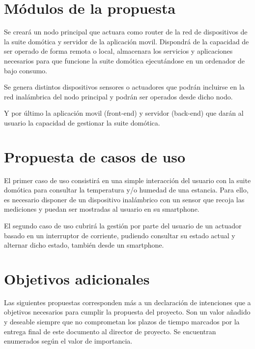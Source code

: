 \section{Módulos de la propuesta}
\label{ch:Capitulo3.2}

Se creará un nodo principal que actuara como router de la red de dispositivos de la suite domótica y servidor de la aplicación movil. Dispondrá de la capacidad de ser operado de forma remota o local, almacenara los servicios y aplicaciones necesarios para que funcione la suite domótica ejecutándose en un ordenador de bajo consumo.

Se genera distintos dispositivos sensores o actuadores que podrán incluirse en la red inalámbrica del nodo principal y podrán ser operados desde dicho nodo.

Y por último la aplicación movil (front-end) y servidor (back-end) que darán al usuario la capacidad de gestionar la suite domótica.

\section{Propuesta de casos de uso}
\label{ch:Capitulo3.3}

El primer caso de uso consistirá en una simple interacción del usuario con la suite domótica para consultar la temperatura y/o humedad de una estancia. Para ello, es necesario disponer de un dispositivo inalámbrico con un sensor que recoja las mediciones y puedan ser mostradas al usuario en su smartphone.

El segundo caso de uso cubrirá la gestión por parte del usuario de un actuador basado en un interruptor de corriente, pudiendo consultar su estado actual y alternar dicho estado, también desde un smartphone.

\section{Objetivos adicionales}
\label{ch:Capitulo3.4}

Las siguientes propuestas corresponden más a un declaración de intenciones que a objetivos necesarios para cumplir la propuesta del proyecto. Son un valor añadido y deseable siempre que no comprometan los plazos de tiempo marcados por la entrega final de este documento al director de proyecto. Se encuentran enumerados según el valor de importancia.

